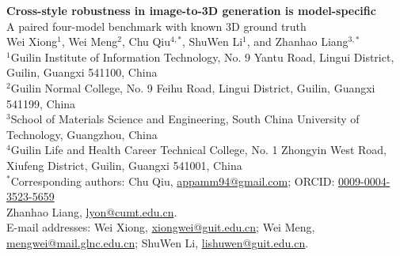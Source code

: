 \documentclass[12pt,a4paper]{article}
\date{}
\begin{document}
\linenumbers

\begin{center}
{\LARGE\bfseries Cross-style robustness in image-to-3D generation is model-specific}
\\[1.2ex]
{\Large A paired four-model benchmark with known 3D ground truth}
\\[4ex]

{\large Wei Xiong$^{1}$, Wei Meng$^{2}$, Chu Qiu$^{4,*}$, ShuWen Li$^{1}$, and Zhanhao Liang$^{3,*}$}
\\[1.5ex]
{\small
$^{1}$Guilin Institute of Information Technology, No. 9 Yantu Road, Lingui District, Guilin, Guangxi 541100, China \\
$^{2}$Guilin Normal College, No. 9 Feihu Road, Lingui District, Guilin, Guangxi 541199, China \\
$^{3}$School of Materials Science and Engineering, South China University of Technology, Guangzhou, China \\
$^{4}$Guilin Life and Health Career Technical College, No. 1 Zhongyin West Road, Xiufeng District, Guilin, Guangxi 541001, China \\
$^{*}$Corresponding authors: Chu Qiu, \href{mailto:appamm94@gmail.com}{appamm94@gmail.com}; ORCID: \href{https://orcid.org/0009-0004-3523-5659}{0009-0004-3523-5659} \\
Zhanhao Liang, \href{mailto:lyon@cumt.edu.cn}{lyon@cumt.edu.cn}. \\
E-mail addresses: Wei Xiong, \href{mailto:xiongwei@guit.edu.cn}{xiongwei@guit.edu.cn};
Wei Meng, \href{mailto:mengwei@mail.glnc.edu.cn}{mengwei@mail.glnc.edu.cn};
ShuWen Li, \href{mailto:lishuwen@guit.edu.cn}{lishuwen@guit.edu.cn}.
}
\end{center}
\end{document}
